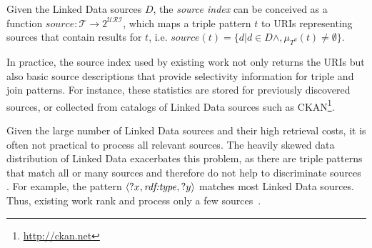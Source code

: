\begin{definition}
  \label{def:index}
  Given the Linked Data sources $D$, the \emph{source index} can be conceived as a function $source : \mathcal{T} \to 2^\mathcal{URI}$, which maps a triple pattern $t$ to URIs representing sources that contain results for $t$, i.e. $source(t) =
  \{d| d \in D \wedge, \mu_{T^d}(t) \neq \emptyset \}$. 
\end{definition}
%

In practice, the source index used by existing work not only returns the URIs but also basic source descriptions that provide selectivity information for triple and join patterns. For instance, these statistics are stored for previously discovered sources, or collected from catalogs of Linked Data sources such as CKAN\footnote{\url{http://ckan.net}}.

Given the large number of Linked Data sources and their high retrieval costs, it is often not practical to process all relevant sources. The heavily skewed data
distribution of Linked Data exacerbates this problem, as there are
triple patterns that match all or many sources and therefore do not
help to discriminate sources \cite{ladwig_linked_2010}. For example, 
the pattern $\langle ?x, \mbox{\emph{rdf:type}}, ?y \rangle$ matches most Linked Data sources. Thus, existing work rank and process only a few sources~\cite{harth_data_2010,ladwig_linked_2010}.


